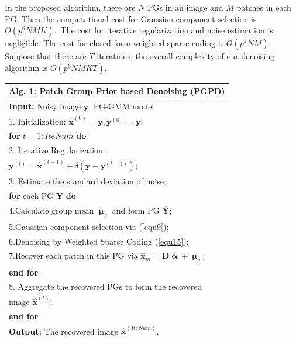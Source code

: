 \documentclass[10pt,twocolumn,letterpaper]{article}
\begin{document}
In the proposed algorithm, there are $N$ PGs in an image and $M$ patches in each PG. Then the computational cost for Gaussian component selection is $O(p^{6}NMK)$.\ The cost for iterative regularization and noise estimation is negligible. The cost for closed-form weighted sparse coding is $O(p^{4}NM)$. Suppose that there are $T$ iterations, the overall complexity of our denoising algorithm is $O(p^{6}NMKT)$.

\begin{table}
\label{alg1}
\begin{tabular}{l}
\hline
\textbf{Alg. 1}: Patch Group Prior based Denoising (PGPD)
\\
\hline
\textbf{Input:} Noisy image $\mathbf{y}$, PG-GMM model
\\
1. Initialization: $\hat{\mathbf{x}}^{(0)}=\mathbf{y},\mathbf{y}^{(0)}=\mathbf{y}$;
\\
\textbf{for} $t = 1:IteNum$ \textbf{do}
\\
2. Iterative Regularization:
\\
\quad\quad\quad $\mathbf{y}^{(t)}=\hat{\mathbf{x}}^{(t-1)}+\delta(\mathbf{y}-\mathbf{y}^{(t-1)})$;
\\
3. Estimate the standard deviation of noise;
\\
\quad\textbf{for} each PG $\mathbf{Y}$ \textbf{do}
\\
4.\quad Calculate group mean $\boldsymbol{\upmu}_{y}$ and form PG $\mathbf{\overline{Y}}$;
\\
5.\quad Gaussian component selection via (\ref{equ9});
\\
6.\quad Denoising by Weighted Sparse Coding (\ref{equ15});
\\
7.\quad Recover each patch in this PG via $\hat{\mathbf{x}}_{m}=\mathbf{D}\hat{\boldsymbol{\upalpha}}+\boldsymbol{\upmu}_{y}$;
\\
\quad\textbf{end for}
\\
8. Aggregate the recovered PGs to form the recovered
\\
\quad image $\hat{\mathbf{x}}^{(t)}$;
\\
\textbf{end for}
\\
\textbf{Output:} The recovered image $\hat{\mathbf{x}}^{(IteNum)}$.\\
\hline
\end{tabular}
\end{table}


\end{document}
